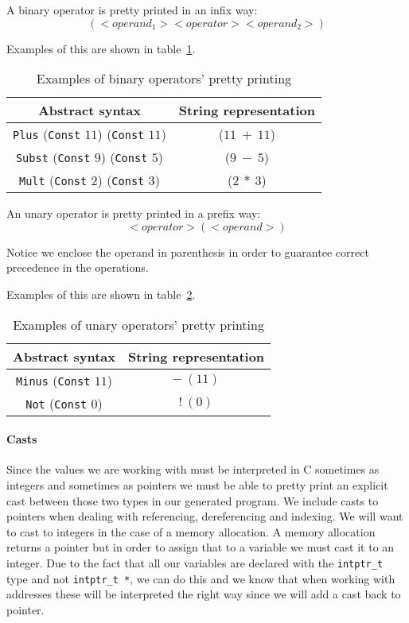 A binary operator is pretty printed in an infix way:
\begin{equation*}
(<operand_1> <operator> <operand_2>)
\end{equation*}

Examples of this are shown in table~\ref{tab:pretty_bin_op}.

\begin{table}[h!]
\centering
\begin{tabular}{|c|c|}
  \hline
  \textbf{Abstract syntax} & \textbf{String representation} \\ [0.5ex]
  \hline \hline
  \verb|Plus| (\verb|Const| $11$) (\verb|Const| $11$) & ($11\ +\ 11$) \\
  \verb|Subst| (\verb|Const| $9$) (\verb|Const| $5$) & ($9\ -\ 5$) \\
  \verb|Mult| (\verb|Const| $2$) (\verb|Const| $3$) & ($2\ *\ 3$) \\
  \hline
\end{tabular}

\caption{Examples of binary operators' pretty printing}
\label{tab:pretty_bin_op}
\end{table}

An unary operator is pretty printed in a prefix way:
\begin{equation*}
<operator> (<operand>)
\end{equation*}

Notice we enclose the operand in parenthesis in order to guarantee correct precedence in the operations.

Examples of this are shown in table~\ref{tab:pretty_un_op}.

\begin{table}[h!]
\centering
\begin{tabular}{|c|c|}
  \hline
  \textbf{Abstract syntax} & \textbf{String representation} \\ [0.5ex]
  \hline \hline
  \verb|Minus| (\verb|Const| $11$) & $-\ (11)$ \\
  \verb|Not| (\verb|Const| $0$) & $!\ (0)$ \\
  \hline
\end{tabular}

\caption{Examples of unary operators' pretty printing}
\label{tab:pretty_un_op}
\end{table}

\paragraph{Casts}
Since the values we are working with must be interpreted in C sometimes as integers and sometimes as pointers we must be able to pretty print an explicit cast between those two types in our generated program.
We include casts to pointers when dealing with referencing, dereferencing and indexing.
We will want to cast to integers in the case of a memory allocation.
A memory allocation returns a pointer but in order to assign that to a variable we must cast it to an integer.
Due to the fact that all our variables are declared with the \verb|intptr_t| type and not \verb|intptr_t *|, we can do this and we know that when working with addresses these will be interpreted the right way since we will add a cast back to pointer.


